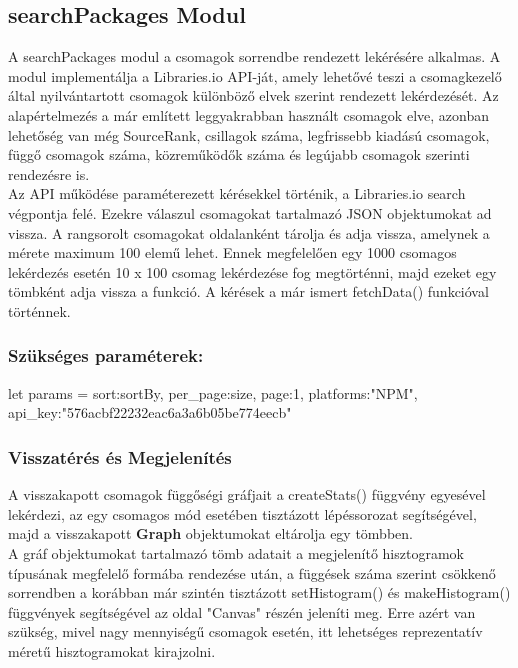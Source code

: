 \subsection{searchPackages Modul}

A searchPackages modul a csomagok sorrendbe rendezett lekérésére alkalmas. A modul implementálja a Libraries.io API-ját, amely lehetővé teszi a csomagkezelő által nyilvántartott csomagok különböző elvek szerint rendezett lekérdezését. Az alapértelmezés a már említett leggyakrabban használt csomagok elve, azonban lehetőség van még SourceRank, csillagok száma, legfrissebb kiadású csomagok, függő csomagok száma, közreműködők száma és legújabb csomagok szerinti rendezésre is.\\

Az API működése paraméterezett kérésekkel történik, a Libraries.io search végpontja felé. Ezekre válaszul csomagokat tartalmazó JSON objektumokat ad vissza. A rangsorolt csomagokat oldalanként tárolja és adja vissza, amelynek a mérete maximum 100 elemű lehet. Ennek megfelelően egy 1000 csomagos lekérdezés esetén 10 x 100 csomag lekérdezése fog megtörténni, majd ezeket egy tömbként adja vissza a funkció. A kérések a már ismert fetchData() funkcióval történnek.

\subsubsection{Szükséges paraméterek:}
\begin{js}
let params = {
	sort:sortBy, 
	per_page:size,
	page:1,
	platforms:"NPM",
	api_key:"576acbf22232eac6a3a6b05be774eecb"
}
\end{js}

\subsubsection{Visszatérés és Megjelenítés}

A visszakapott csomagok függőségi gráfjait a createStats() függvény egyesével lekérdezi, az egy csomagos mód esetében tisztázott lépéssorozat segítségével, majd a visszakapott \textbf{Graph} objektumokat eltárolja egy tömbben.\\

A gráf objektumokat tartalmazó tömb adatait a megjelenítő hisztogramok típusának megfelelő formába rendezése után, a függések száma szerint csökkenő sorrendben a korábban már szintén tisztázott setHistogram() és makeHistogram() függvények segítségével az oldal "Canvas" részén jeleníti meg. Erre azért van szükség, mivel nagy mennyiségű csomagok esetén, itt lehetséges reprezentatív méretű hisztogramokat kirajzolni.

